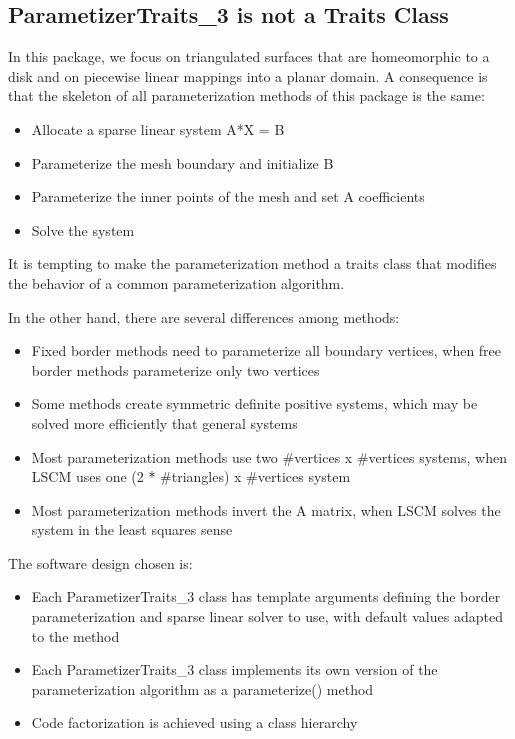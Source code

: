 \subsection{ParametizerTraits\_3 is not a Traits Class}

In this package, we focus on triangulated surfaces that are homeomorphic to a
disk and on piecewise linear mappings into a planar domain.
A consequence is that the skeleton of all parameterization methods of this
package is the same:
\begin{itemize}
\item Allocate a sparse linear system A*X = B
\item Parameterize the mesh boundary and initialize B
\item Parameterize the inner points of the mesh and set A coefficients
\item Solve the system
\end{itemize}

It is tempting to make the parameterization method a traits class that
modifies the behavior of a common parameterization algorithm.

In the other hand, there are several differences among methods:
\begin{itemize}
\item Fixed border methods need to parameterize all boundary vertices,
      when free border methods parameterize only two vertices
\item Some methods create symmetric definite positive systems,
      which may be solved more efficiently that general systems
\item Most parameterization methods use two \#vertices x \#vertices systems,
      when LSCM uses one (2 * \#triangles) x \#vertices system
\item Most parameterization methods invert the A matrix,
      when LSCM solves the system in the least squares sense
\end{itemize}

The software design chosen is:
\begin{itemize}
\item Each ParametizerTraits\_3 class has template arguments
      defining the border parameterization and sparse linear solver to use,
      with default values adapted to the method
\item Each ParametizerTraits\_3 class implements its own version
      of the parameterization algorithm as a parameterize() method
\item Code factorization is achieved using a class hierarchy
\end{itemize}

